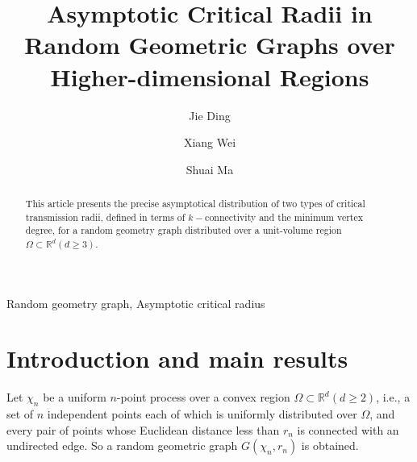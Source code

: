 \documentclass[preprint,12pt]{elsarticle}
\begin{document}
\begin{frontmatter}


\title{Asymptotic  Critical   Radii in Random Geometric Graphs over Higher-dimensional Regions}



\author{Jie Ding} 
\address{School of Computer, Jiangsu University of Science and Technology,  Zhenjiang 212100, China}

 \author{Xiang Wei} %
\address{School of Computer, Jiangsu University of Science and Technology,  Zhenjiang 212100, China}

\author{Shuai Ma} 
\address{ SKLCCSE Lab,
Beihang University, Beijing 100191, China}






%

\begin{abstract}
This article presents  the precise asymptotical distribution of two types of critical transmission radii, defined in terms of
$k-$connectivity and the minimum vertex degree, for a random geometry graph distributed over a  unit-volume region $\Omega\subset \mathbb{R}^d (d\geq 3)$.
\end{abstract}

\begin{keyword}
Random geometry graph, Asymptotic critical   radius
\end{keyword}

\end{frontmatter}


\section{Introduction and main results}
\label{sec-intro}

\par Let $\chi_n$ be a uniform $n$-point process over a
  convex region $\Omega\subset\mathbb{R}^d(d\geq2)$, i.e., a set of $n$ independent
points each of which is uniformly distributed over $\Omega$, and every pair of points whose Euclidean distance less than $r_n$ is
connected with an undirected edge. So  a random geometric
graph $G(\chi_n,r_n)$ is obtained.
\end{document}
